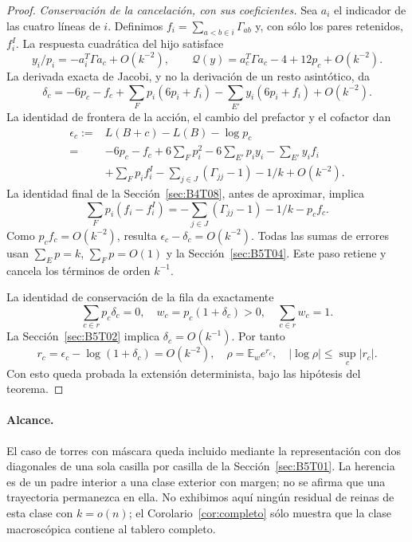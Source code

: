 \begin{proof}
\par\emph{Conservación de la cancelación, con sus coeficientes.}
Sea $a_i$ el indicador de las cuatro líneas de $i$. Definimos
$f_i=\sum_{a<b\in i}\Gamma_{ab}$ y, con sólo los pares retenidos, $f_i^I$.
La respuesta cuadrática del hijo satisface
\[
 y_i/p_i=-a_i^T\Gamma a_c+O(k^{-2}),\qquad
 \mathcal Q(y)=a_c^T\Gamma a_c-4+12p_c+O(k^{-2}).
\]
La derivada exacta de Jacobi, y no la derivación de un resto asintótico, da
\[
 \delta_c=-6p_c-f_c+\sum_Fp_i(6p_i+f_i)
             -\sum_{E'}y_i(6p_i+f_i)+O(k^{-2}).
\]
La identidad de frontera de la acción, el cambio del prefactor y el cofactor dan
\[
 \begin{aligned}
 \epsilon_c:={}&L(B+c)-L(B)-\log p_c\\
 ={}&-6p_c-f_c+6\sum_Fp_i^2-6\sum_{E'}p_iy_i-\sum_{E'}y_if_i\\
 &+\sum_Fp_if_i^I-\sum_{j\in J}(\Gamma_{jj}-1)-1/k+O(k^{-2}).
 \end{aligned}
\]
La identidad final de la Sección~\ref{sec:B4T08}, antes de aproximar, implica
\[
 \sum_Fp_i(f_i-f_i^I)
 =-\sum_{j\in J}(\Gamma_{jj}-1)-1/k-p_cf_c.
\]
Como $p_cf_c=O(k^{-2})$, resulta $\epsilon_c-\delta_c=O(k^{-2})$.
Todas las sumas de errores usan $\sum_Ep=k$, $\sum_Fp=O(1)$ y la Sección~\ref{sec:B5T04}.
Este paso retiene y cancela los términos de orden $k^{-1}$.

La identidad de conservación de la fila da exactamente
\[
 \sum_{c\in r}p_c\delta_c=0,\quad
 w_c=p_c(1+\delta_c)>0,\quad\sum_{c\in r}w_c=1.
\]
La Sección~\ref{sec:B5T02} implica $\delta_c=O(k^{-1})$. Por tanto
\[
 r_c=\epsilon_c-\log(1+\delta_c)=O(k^{-2}),\quad
 \rho=\mathbb E_w e^{r_c},\quad|\log\rho|\le\sup_c|r_c|.
\]
Con esto queda probada la extensión determinista, bajo las hipótesis del teorema.
\end{proof}

\paragraph{Alcance.}
El caso de torres con máscara queda incluido mediante la representación con dos diagonales
de una sola casilla por casilla de la Sección~\ref{sec:B5T01}. La herencia es de un padre interior a una
clase
exterior con margen; no se afirma que una trayectoria permanezca en ella. No exhibimos aquí ningún
residual de reinas de esta clase con $k=o(n)$; el Corolario~\ref{cor:completo} sólo muestra que la
clase macroscópica contiene al tablero completo.
